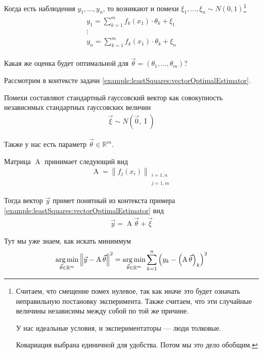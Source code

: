 Когда есть наблюдения $y_1, \dots, y_n$, то возникают и помехи
$\xi_1, \dots, \xi_n \sim N\left( 0, 1 \right)$\footnote{Считаем, что смещение
помех нулевое, так как иначе это будет означать неправильную постановку
эксперимента. Также считаем, что эти случайные величины независимы между собой
по той же причине.

У нас идеальные условия, и экспериментаторы --- люди толковые.

Ковариация выбрана единичной для удобства. Потом мы это дело обобщим.}
\begin{align*}
    \begin{array}{c}
        y_1 = \sum_{k=1}^{m} f_k\left( x_1 \right) \cdot \theta_k + \xi_1 \\
        \vdots \\
        y_n = \sum_{k=1}^{m} f_k\left( x_1 \right) \cdot \theta_k + \xi_n
    \end{array}
\end{align*}

Какая же оценка будет оптимальной для
$\vec{\theta} = \left( \theta_1, \dots, \theta_m \right)$?

Рассмотрим в контексте задачи \ref{example:leastSquares:vectorOptimalEstimator}.

\begin{example}
    Помехи составляют стандартный гауссовский вектор как совокупность
    независимых стандартных гауссовских величин
    \begin{align*}
        \vec{\xi} \sim N\left( \vec{0}, \operatorname{I} \right)
    \end{align*}

    Также у нас есть параметр $\vec{\theta} \in \mathbb{R}^m$.

    Матрица $\operatorname{A}$ принимает следующий вид
    \begin{align*}
        \operatorname{A} = \left\| f_j\left( x_i \right) \right\|_{
            \substack{i = \overline{1, n} \\ j = \overline{1, m}}}
    \end{align*}

    Тогда вектор $\vec{y}$ примет понятный из контекста примера
    \ref{example:leastSquares:vectorOptimalEstimator} вид
    \begin{align*}
        \vec{y} = \operatorname{A} \vec{\theta} + \vec{\xi}
    \end{align*}

    Тут мы уже знаем, как искать миниммум
    \begin{align*}
        \argminof{\left\| \vec{y} - \operatorname{A} \vec{\theta} \right\|^2}{
            \vec{\theta} \in \mathbb{R}^m}
        = \argminof{\sum_{k=1}^{n} \left( y_k
                - \left( \operatorname{A} \vec{\theta} \right)_k \right)^2}{
            \vec{\theta} \in \mathbb{R}^m}
    \end{align*}
\end{example}

